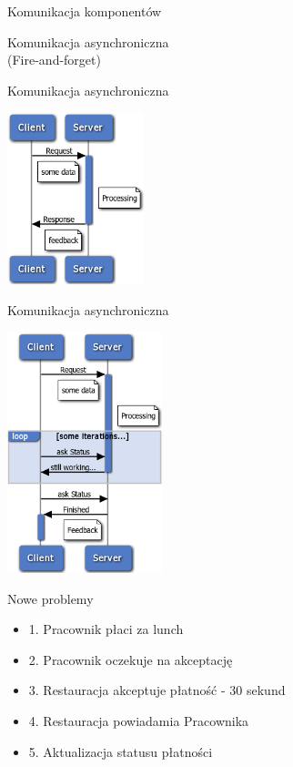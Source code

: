 \documentclass{beamer}
\begin{document}
\begin{frame}{Komunikacja komponentów}
	\begin{center}
		\Huge{Komunikacja asynchroniczna}\\
		\huge{(Fire-and-forget)}
	\end{center}
\end{frame}

\begin{frame}{Komunikacja asynchroniczna}
	\begin{center}
		\includegraphics[height=5cm]{async1.png}
	\end{center}
\end{frame}

\begin{frame}{Komunikacja asynchroniczna}
	\begin{center}
		\includegraphics[height=7cm]{async2.png}
	\end{center}
\end{frame}

\begin{frame}{Nowe problemy}
	\begin{Large}
		\begin{itemize}[<+->]
			\item[] 1. Pracownik płaci za lunch
			\item[] 2. Pracownik oczekuje na akceptację
			\item[] 3. Restauracja akceptuje płatność - 30 sekund
			\item[] 4. Restauracja powiadamia Pracownika
			\item[] 5. Aktualizacja statusu płatności
		\end{itemize}
	\end{Large}
\end{frame}
\end{document}

